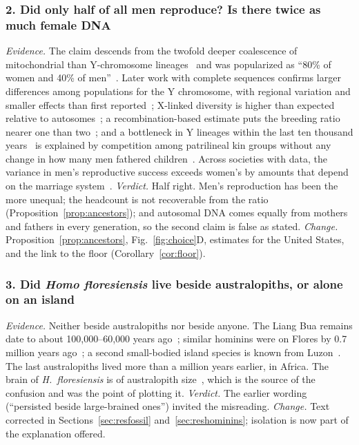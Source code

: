 \subsubsection{2. Did only half of all men reproduce? Is there twice as much female DNA}
\emph{Evidence.} The claim descends from the twofold deeper coalescence of mitochondrial than Y-chromosome
lineages~\cite{wilder2004} and was popularized as ``80\% of women and 40\% of men''~\cite{baumeister2010}. Later work with
complete sequences confirms larger differences among populations for the Y chromosome, with regional variation and smaller
effects than first reported~\cite{lippold2014}; X-linked diversity is higher than expected relative to
autosomes~\cite{hammer2008}; a recombination-based estimate puts the breeding ratio nearer one than two~\cite{labuda2010}; and a
bottleneck in Y lineages within the last ten thousand years~\cite{karmin2015} is explained by competition among patrilineal
kin groups without any change in how many men fathered children~\cite{zeng2018}. Across societies with data, the variance
in men's reproductive success exceeds women's by amounts that depend on the marriage system~\cite{brown2009,betzig2012}.
\emph{Verdict.} Half right. Men's reproduction has been the more unequal; the headcount is not recoverable from the ratio
(Proposition~\ref{prop:ancestors}); and autosomal DNA comes equally from mothers and fathers in every generation, so the
second claim is false as stated. \emph{Change.} Proposition~\ref{prop:ancestors}, Fig.~\ref{fig:choice}D, estimates for
the United States, and the link to the floor (Corollary~\ref{cor:floor}).

\subsubsection{3. Did \textit{Homo floresiensis} live beside australopiths, or alone on an island}
\emph{Evidence.} Neither beside australopiths nor beside anyone. The Liang Bua remains date to about 100,000--60,000 years
ago~\cite{sutikna2016}; similar hominins were on Flores by 0.7 million years ago~\cite{brumm2016,vandenbergh2016}; a second
small-bodied island species is known from Luzon~\cite{detroit2019}. The last australopiths lived more than a million years
earlier, in Africa. The brain of \textit{H.~floresiensis} is of australopith size~\cite{kubo2013}, which is the source of
the confusion and was the point of plotting it. \emph{Verdict.} The earlier wording (``persisted beside large-brained
ones'') invited the misreading. \emph{Change.} Text corrected in Sections~\ref{sec:resfossil} and~\ref{sec:reshominins};
isolation is now part of the explanation offered.

